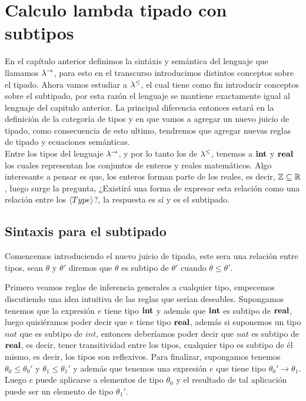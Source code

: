 \chapter{Calculo lambda tipado con subtipos}

En el cap\'itulo anterior definimos la sint\'axis y sem\'antica del lenguaje que llamamos
$\lambda^{\rightarrow}$, para esto en el transcurso introducimos distintos conceptos sobre el tipado.
Ahora vamos estudiar a $\lambda^{\leq}$, el cual tiene como fin introducir conceptos sobre
el subtipado, por esta raz\'on el lenguaje se mantiene exactamente igual al lenguaje 
del capitulo anterior. La principal diferencia entonces estar\'a en la definici\'on
de la categor\'ia de tipos y en que vamos a agregar un nuevo juicio de tipado, como
consecuencia de esto ultimo, tendremos que agregar nuevas reglas de tipado y ecuaciones 
sem\'anticas.\\

Entre los tipos del lenguaje $\lambda^{\rightarrow}$, y por lo tanto los de $\lambda^{\leq}$, tenemos
a $\textbf{int}$ y $\textbf{real}$ los cuales representan los conjuntos de enteros y reales matem\'aticos.
Algo interesante a pensar es que, los enteros forman parte de los reales, es decir,
$\mathbb{Z} \subseteq \mathbb{R}$, luego surge la pregunta, ¿Existir\'a una forma de expresar esta relaci\'on 
como una relaci\'on entre los $\langle Type \rangle$?, la respuesta es s\'i y es el subtipado.

\section{Sintaxis para el subtipado}

Comencemos introduciendo el nuevo juicio de tipado, este sera una relaci\'on entre tipos,
sean $\theta$ y $\theta'$ diremos que $\theta$ es subtipo de $\theta'$ cuando $\theta \leq \theta'$.

Primero veamos reglas de inferencia generales a cualquier tipo, empecemos discutiendo
una idea intuitiva de las reglas que ser\'ian deseables. Supongamos tenemos que la expresi\'on
$e$ tiene tipo $\textbf{int}$ y adem\'as que $\textbf{int}$ es subtipo de $\textbf{real}$, luego quisi\'eramos 
poder decir que $e$ tiene tipo $\textbf{real}$, adem\'as si suponemos un tipo $nat$ que es
subtipo de $int$, entonces deber\'iamos poder decir que $nat$ es subtipo de $\textbf{real}$,
es decir, tener transitividad entre los tipos, cualquier tipo es
subtipo de \'el mismo, es decir, los tipos son reflexivos. Para finalizar, 
supongamos tenemos $\theta_0 \leq \theta_0'$ y $\theta_1 \leq \theta_1'$ y adem\'as
que tenemos una expresi\'on $e$ que tiene tipo $\theta_0' \rightarrow \theta_1$. Luego
$e$ puede aplicarse a elementos de tipo $\theta_0$ y el resultado de tal aplicaci\'on
puede ser un elemento de tipo $\theta_1'$.\\


